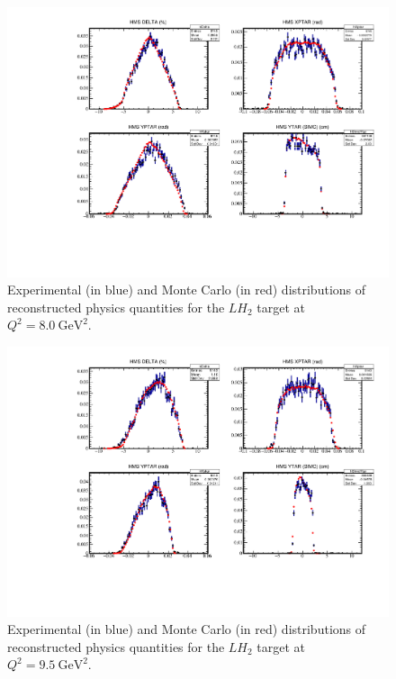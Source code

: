 \begin{figure}[!h]
    \centering
    \includegraphics[page=3,width=1.0\textwidth]{pass5_report/Report_h8.pdf}
    \caption{
            Experimental (in blue) and Monte Carlo (in red) distributions of
            reconstructed physics quantities for
            the $LH_2$ target at $Q^2=\SI{8.0}{\giga\electronvolt\squared}$.
            }
    \label{fig:Report_h8.pdf}
\end{figure}


\begin{figure}[!h]
    \centering
    \includegraphics[page=3,width=1.0\textwidth]{pass5_report/Report_h95sm.pdf}
    \caption{
            Experimental (in blue) and Monte Carlo (in red) distributions of
            reconstructed physics quantities for
            the $LH_2$ target at $Q^2=\SI{9.5}{\giga\electronvolt\squared}$.
            }
    \label{fig:Report_h95sm.pdf}
\end{figure}


